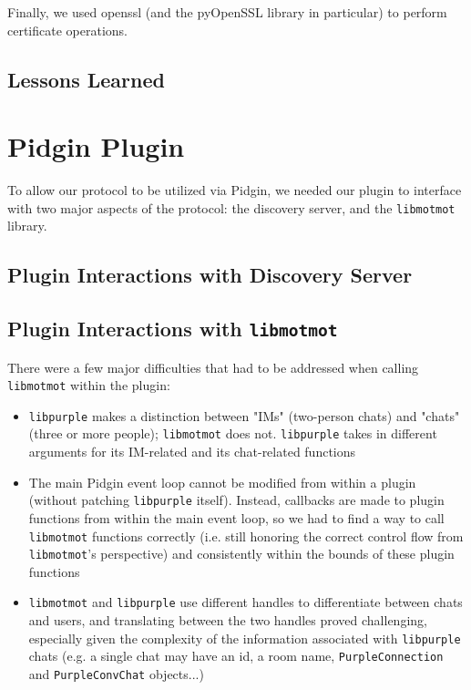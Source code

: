 \documentclass{sig-alternate}
\newcommand\libmotmot{\texttt{libmotmot}\xspace}
\newcommand\libpurple{\texttt{libpurple}\xspace}
\begin{document}
Finally, we used openssl (and the pyOpenSSL library in particular) to perform
certificate operations.

\subsection{Lessons Learned}


\section{Pidgin Plugin}

To allow our protocol to be utilized via Pidgin, we needed our plugin to
interface with two major aspects of the protocol: the discovery server, and the
\libmotmot library.

\subsection{Plugin Interactions with Discovery Server}


\subsection{Plugin Interactions with \libmotmot}
There were a few major difficulties that had to be addressed when calling
\libmotmot within the plugin:

\begin{itemize}
\item \libpurple makes a distinction between "IMs" (two-person chats) and
"chats" (three or more people); \libmotmot does not.  \libpurple takes in
different arguments for its IM-related and its chat-related functions

\item The main Pidgin event loop cannot be modified from within a plugin
(without patching \libpurple itself).  Instead, callbacks are made to plugin
functions from within the main event loop, so we had to find a way to call
\libmotmot functions correctly (i.e. still honoring the correct control flow
from \libmotmot's perspective) and consistently within the bounds of these
plugin functions

\item \libmotmot and \libpurple use different handles to differentiate between
chats and users, and translating between the two handles proved challenging,
especially given the complexity of the information associated with \libpurple
chats (e.g. a single chat may have an id, a room name, \verb`PurpleConnection`
and \verb`PurpleConvChat` objects...)

\end{itemize}
\end{document}
